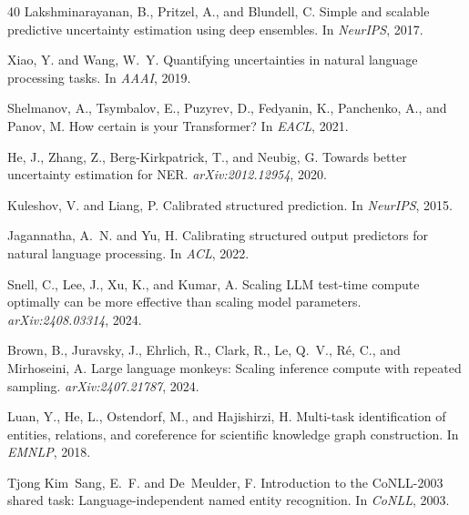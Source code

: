 \documentclass[11pt,a4paper]{article}
\begin{document}
\begin{thebibliography}{40}
Lakshminarayanan, B., Pritzel, A., and Blundell, C.
\newblock Simple and scalable predictive uncertainty estimation using deep ensembles.
\newblock In \emph{NeurIPS}, 2017.

Xiao, Y. and Wang, W.~Y.
\newblock Quantifying uncertainties in natural language processing tasks.
\newblock In \emph{AAAI}, 2019.

Shelmanov, A., Tsymbalov, E., Puzyrev, D., Fedyanin, K., Panchenko, A., and Panov, M.
\newblock How certain is your {T}ransformer?
\newblock In \emph{EACL}, 2021.

He, J., Zhang, Z., Berg-Kirkpatrick, T., and Neubig, G.
\newblock Towards better uncertainty estimation for NER.
\newblock \emph{arXiv:2012.12954}, 2020.

Kuleshov, V. and Liang, P.
\newblock Calibrated structured prediction.
\newblock In \emph{NeurIPS}, 2015.

Jagannatha, A.~N. and Yu, H.
\newblock Calibrating structured output predictors for natural language processing.
\newblock In \emph{ACL}, 2022.

Snell, C., Lee, J., Xu, K., and Kumar, A.
\newblock Scaling {LLM} test-time compute optimally can be more effective than scaling model parameters.
\newblock \emph{arXiv:2408.03314}, 2024.

Brown, B., Juravsky, J., Ehrlich, R., Clark, R., Le, Q.~V., R{\'e}, C., and Mirhoseini, A.
\newblock Large language monkeys: Scaling inference compute with repeated sampling.
\newblock \emph{arXiv:2407.21787}, 2024.

Luan, Y., He, L., Ostendorf, M., and Hajishirzi, H.
\newblock Multi-task identification of entities, relations, and coreference for scientific knowledge graph construction.
\newblock In \emph{EMNLP}, 2018.

Tjong Kim~Sang, E.~F. and De~Meulder, F.
\newblock Introduction to the {CoNLL}-2003 shared task: Language-independent named entity recognition.
\newblock In \emph{CoNLL}, 2003.


\end{thebibliography}
\end{document}
